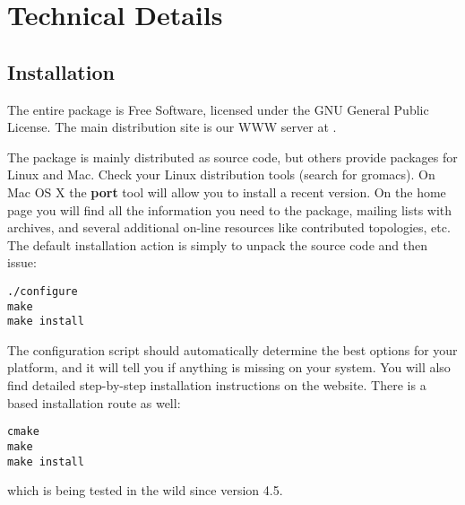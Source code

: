 %
% 
% 
% 
% 
% 
% 
% 
% 
%

\chapter{Technical Details}
\label{ch:install}
\section{Installation}
The entire {\gromacs} package is Free Software, licensed under the GNU
General Public License. The main distribution site is our WWW server at
{\wwwpage}. 

The package is mainly distributed as source code, but others provide
packages for Linux and Mac. Check your Linux distribution tools
(search for gromacs). On Mac OS X the {\bf port} tool will allow you
to install a recent version.
On the home page you will find all the information you need to 
 the package, mailing lists with archives,
and several additional on-line resources like contributed topologies, etc.
The default installation action is simply to unpack the source code and
then issue:
\begin{verbatim}
./configure
make
make install
\end{verbatim}
The configuration script should automatically determine the best options
for your platform, and it will tell you if anything is missing on
your system. You will also find detailed step-by-step installation
instructions on the website. There is a  based
installation route as well:
\begin{verbatim}
cmake
make
make install
\end{verbatim}
which is being tested in the wild since {\gromacs} version 4.5.

